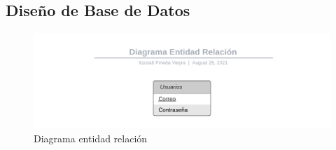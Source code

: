 \documentclass{article}
\begin{document}
\subsection{Diseño de Base de Datos}%
\begin{figure}[H]
    \centering
    \includegraphics[scale=0.9]{imgs/BSD}
    \caption{Diagrama entidad relación}
\end{figure}
\end{document}
